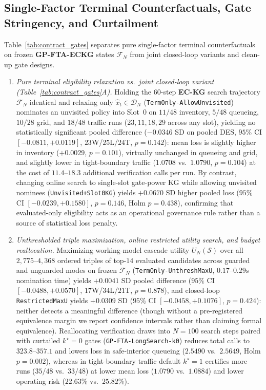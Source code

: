 




\subsection{Single-Factor Terminal Counterfactuals, Gate Stringency, and Curtailment}\label{sec:contract_gates_results}

Table~\ref{tab:contract_gates} separates pure single-factor terminal counterfactuals on frozen \textbf{GP-FTA-ECKG} states $\mathcal{F}_N$ from joint closed-loop variants and clean-up gate designs.
\begin{enumerate}
  \item \emph{Pure terminal eligibility relaxation vs.\ joint closed-loop variant (Table~\ref{tab:contract_gates}A).} Holding the $60$-step \textbf{EC-KG} search trajectory $\mathcal{F}_N$ identical and relaxing only $\hat{x}_t \in \mathcal{D}_N$ (\texttt{TermOnly-AllowUnvisited}) nominates an unvisited policy into Slot~$0$ on $11/48$ inventory, $5/48$ queueing, $10/28$ grid, and $18/48$ traffic runs ($23, 11, 18, 29$ across any slot), yielding no statistically significant pooled difference ($-0.0346$ SD on pooled DES, $95\%$ CI $[-0.0811, +0.0119]$, $23$W/$25$L/$24$T, $p=0.142$): mean loss is slightly higher in inventory ($+0.0029$, $p=0.101$), virtually unchanged in queueing and grid, and slightly lower in tight-boundary traffic ($1.0708$ vs.\ $1.0790$, $p=0.104$) at the cost of $11.4$--$18.3$ additional verification calls per run. By contrast, changing online search to single-slot gate-power KG while allowing unvisited nominees (\texttt{Unvisited+Slot0KG}) yields $+0.0670$ SD higher pooled loss ($95\%$ CI $[-0.0239, +0.1580]$, $p=0.146$, Holm $p=0.438$), confirming that evaluated-only eligibility acts as an operational governance rule rather than a source of statistical loss penalty.
  \item \emph{Unthresholded triple maximization, online restricted utility search, and budget reallocation.} Maximizing working-model cascade utility $U_N(\mathcal{S})$ over all $2{,}775$--$4{,}368$ ordered triples of top-$14$ evaluated candidates across guarded and unguarded modes on frozen $\mathcal{F}_N$ (\texttt{TermOnly-UnthreshMaxU}, $0.17$--$0.29\text{s}$ nomination time) yields $+0.0041$ SD pooled difference ($95\%$ CI $[-0.0488, +0.0570]$, $17$W/$34$L/$21$T, $p=0.878$), and closed-loop \texttt{RestrictedMaxU} yields $+0.0309$ SD ($95\%$ CI $[-0.0458, +0.1076]$, $p=0.424$): neither detects a meaningful difference (though without a pre-registered equivalence margin we report confidence intervals rather than claiming formal equivalence). Reallocating verification draws into $N=100$ search steps paired with curtailed $k^\star=0$ gates (\texttt{GP-FTA-LongSearch-k0}) reduces total calls to $323.8$--$357.1$ and lowers loss in safe-interior queueing ($2.5490$ vs.\ $2.5649$, Holm $p=0.002$), whereas in tight-boundary traffic default $k^\star=1$ certifies more runs ($35/48$ vs.\ $33/48$) at lower mean loss ($1.0790$ vs.\ $1.0884$) and lower operating risk ($22.63\%$ vs.\ $25.82\%$).

\end{enumerate}
